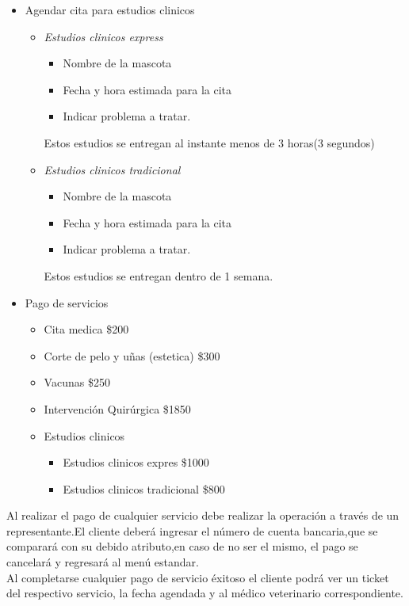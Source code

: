 \documentclass{bachw}
\begin{document}
\begin{itemize}
\begin{itemize}
        \item Agendar cita para estudios clinicos
            \begin{itemize}
                \item \textit{Estudios clinicos express}
                \begin{itemize}    
                    \item Nombre de la mascota
                    \item Fecha y hora estimada para la cita
                    \item Indicar problema a tratar.
                \end{itemize}
                Estos estudios se entregan al instante menos de 3 horas(3 segundos)
                \item \textit{Estudios clinicos tradicional}
                \begin{itemize}    
                    \item Nombre de la mascota
                    \item Fecha y hora estimada para la cita
                    \item Indicar problema a tratar.
                \end{itemize}
                Estos estudios se entregan dentro de 1 semana.
            \end{itemize}
     
        \item Pago de servicios
        \begin{itemize}
            \item Cita medica \$200
            \item Corte de pelo y uñas (estetica) \$300
            \item Vacunas \$250
            \item Intervención Quirúrgica \$1850
            \item Estudios clinicos
            \begin{itemize}
                  \item Estudios clinicos expres \$1000
                  \item Estudios clinicos tradicional \$800
                  \end{itemize}
        \end{itemize}
    \end{itemize}

    Al realizar el pago de cualquier servicio debe realizar la operación a través de un representante.El cliente deberá ingresar
    el número de cuenta bancaria,que se comparará con su debido atributo,en caso de no ser el mismo, el pago se cancelará y 
    regresará al menú estandar.\\
    Al completarse cualquier pago de servicio éxitoso el cliente podrá ver un ticket del respectivo servicio, la fecha agendada
    y al médico veterinario correspondiente.
\end{itemize}
\end{document}
